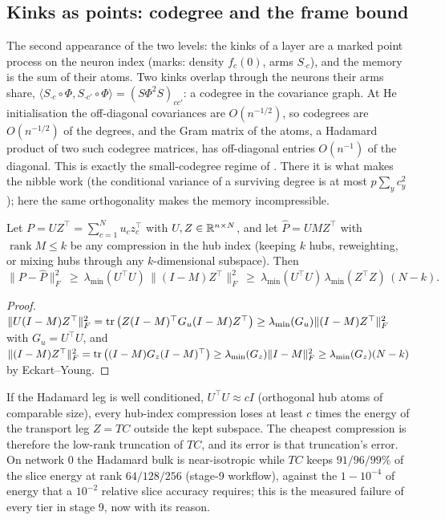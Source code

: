\subsection{Kinks as points: codegree and the frame bound}
The second appearance of the two levels: the kinks of a layer are a marked point process on the neuron index
(marks: density $f_c(0)$, arms $S_{\cdot c}$), and the memory is the sum of their atoms. Two kinks overlap through the
neurons their arms share, $\langle S_{\cdot c}\circ\Phi,S_{\cdot c'}\circ\Phi\rangle=(S\Phi^2S)_{cc'}$: a codegree in the
covariance graph. At He initialisation the off-diagonal covariances are $O(n^{-1/2})$, so codegrees are $O(n^{-1/2})$ of
the degrees, and the Gram matrix of the atoms, a Hadamard product of two such codegree matrices, has off-diagonal
entries $O(n^{-1})$ of the diagonal. This is exactly the small-codegree regime of \cite[\S3.3--3.4]{survey}. There it
is what makes the nibble work (the conditional variance of a surviving degree is at most $p\sum_yc_y^2$); here the
same orthogonality makes the memory incompressible.

\begin{theorem}\label{thm:frame}
Let $P=UZ^{\top}=\sum_{c=1}^Nu_cz_c^{\top}$ with $U,Z\in\mathbb R^{n\times N}$, and let $\hat P=UMZ^{\top}$ with $\operatorname{rank}M\le k$ be
any compression in the hub index (keeping $k$ hubs, reweighting, or mixing hubs through any $k$-dimensional subspace).
Then
\[
\|P-\hat P\|_F^2\ \ge\ \lambda_{\min}(U^{\top}U)\,\|(I-M)Z^{\top}\|_F^2\ \ge\ \lambda_{\min}(U^{\top}U)\,\lambda_{\min}(Z^{\top}Z)\,(N-k).
\]
\end{theorem}
\begin{proof}
$\|U(I-M)Z^{\top}\|_F^2=\operatorname{tr}\big(Z(I-M)^{\top}G_u(I-M)Z^{\top}\big)\ge\lambda_{\min}(G_u)\|(I-M)Z^{\top}\|_F^2$ with $G_u=U^{\top}U$, and
$\|(I-M)Z^{\top}\|_F^2=\operatorname{tr}\big((I-M)G_z(I-M)^{\top}\big)\ge\lambda_{\min}(G_z)\|I-M\|_F^2\ge\lambda_{\min}(G_z)(N-k)$ by
Eckart--Young.
\end{proof}

\begin{corollary}
If the Hadamard leg is well conditioned, $U^{\top}U\approx cI$ (orthogonal hub atoms of comparable size), every
hub-index compression loses at least $c$ times the energy of the transport leg $Z=TC$ outside the kept subspace. The
cheapest compression is therefore the low-rank truncation of $TC$, and its error is that truncation's error. On network $0$
the Hadamard bulk is near-isotropic while $TC$ keeps $91/96/99\%$ of the slice energy at rank $64/128/256$ (stage-9
workflow), against the $1-10^{-4}$ of energy that a $10^{-2}$ relative slice accuracy requires; this is the measured
failure of every tier in stage 9, now with its reason.
\end{corollary}

